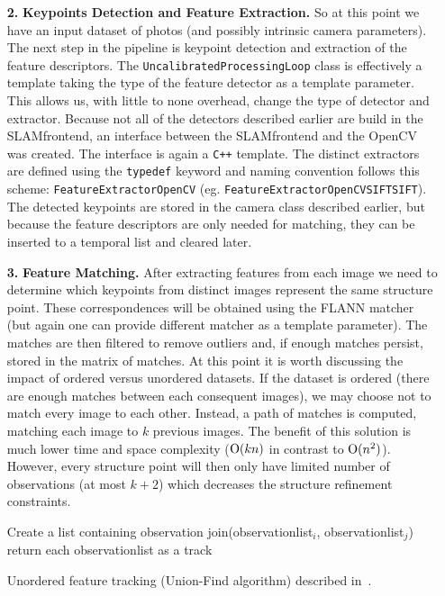 \begin{itemize}
\item[\textbf{2.}] \textbf{Keypoints Detection and Feature Extraction.}
So at this point we have an input dataset of photos (and possibly intrinsic camera parameters). The next step in the pipeline is keypoint detection and extraction of the feature descriptors. The \texttt{UncalibratedProcessingLoop} class is effectively a template taking the type of the feature detector as a template parameter. This allows us, with little to none overhead, change the type of detector and extractor. Because not all of the detectors described earlier are build in the SLAM\textunderscore frontend, an interface between the SLAM\textunderscore frontend and the OpenCV was created. The interface is again a \texttt{C++} template. The distinct extractors are defined using the \texttt{typedef} keyword and naming convention follows this scheme: \texttt{FeatureExtractor\textunderscore OpenCV\textunderscore[detector]\textunderscore[extractor]} (eg. \texttt{FeatureExtractor\textunderscore OpenCV\textunderscore SIFT\textunderscore SIFT}). The detected keypoints are stored in the camera class described earlier, but because the feature descriptors are only needed for matching, they can be inserted to a temporal list and cleared later.

\item[\textbf{3.}] \textbf{Feature Matching.}
After extracting features from each image we need to determine which keypoints from distinct images represent the same structure point. These correspondences will be obtained using the FLANN matcher (but again one can provide different matcher as a template parameter). The matches are then filtered to remove outliers and, if enough matches persist, stored in the matrix of matches. At this point it is worth discussing the impact of ordered versus unordered datasets. If the dataset is ordered (there are enough matches between each consequent images), we may choose not to match every image to each other. Instead, a path of matches is computed, matching each image to $k$ previous images. The benefit of this solution is much lower time and space complexity ($\textrm O(kn)$ in contrast to $\textrm O(n^2)$). However, every structure point will then only have limited number of observations (at most $k+2$) which decreases the structure refinement constraints. 

\begin{algorithm}[ht]
\begin{algorithmic}[1]
	\Statex
		\State Create a list containing observation
	\EndFor
		\State join(observation\textunderscore list$_i$, observation\textunderscore list$_j$)
	\EndFor
	\State return each observation\textunderscore list as a track
\end{algorithmic}
\caption{Unordered feature tracking (Union-Find algorithm) described in~\cite{feature-tracking}.}
\label{feature-track-algorithm}
\end{algorithm}


\end{itemize}
